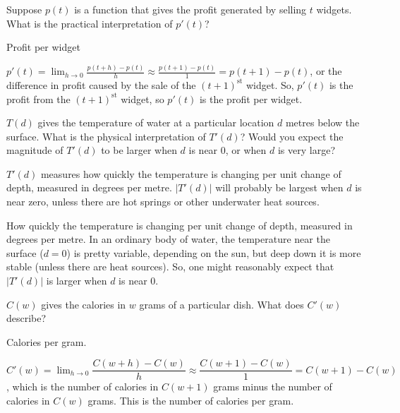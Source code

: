 \begin{question}Suppose $p(t)$ is a function that gives the profit generated by selling $t$ widgets. What is the practical interpretation of $p'(t)$?
\end{question}
\begin{answer} Profit per widget
\end{answer}
\begin{solution}
$p'(t) = \displaystyle\lim_{h \rightarrow 0}\frac{p(t+h)-p(t)}{h} \approx \frac{p(t+1)-p(t)}{1} = p(t+1)-p(t)$, or the difference in profit caused by the sale of the $(t+1)^{\mathrm{st}}$ widget. So, $p'(t)$ is the profit from the $(t+1)^{\mathrm{st}}$ widget, so $p'(t)$ is the profit per widget.
\end{solution}

\begin{question} $T(d)$ gives the temperature of water at a particular location $d$ metres below the surface. What is the physical interpretation of $T'(d)$? Would you expect the magnitude of $T'(d)$ to be larger when $d$ is near 0, or when $d$ is very large?
\end{question}
\begin{answer} $T'(d)$ measures how quickly the temperature is changing per unit change of depth, measured in degrees per metre. $|T'(d)|$ will probably be largest when $d$ is near zero, unless there are hot springs or other underwater heat sources.
\end{answer}
\begin{solution} How quickly the temperature is changing per unit change of depth, measured in degrees per metre. In an ordinary body of water, the temperature near the surface ($d=0$) is pretty variable, depending on the sun, but deep down it is more stable (unless there are heat sources). So, one might reasonably expect that $|T'(d)|$ is larger when $d$ is near 0.
\end{solution}

\begin{question}$C(w)$ gives the calories in $w$ grams of a particular dish. What does $C'(w)$ describe?
\end{question}
\begin{answer} Calories per gram.
\end{answer}
\begin{solution} $C'(w)=\displaystyle\lim_{h \rightarrow 0} \dfrac{C(w+h)-C(w)}{h} \approx \dfrac{C(w+1)-C(w)}{1}=C(w+1)-C(w)$, which is the number of calories in $C(w+1)$ grams minus the number of calories in $C(w)$ grams. This is the number of calories per gram.
\end{solution}

